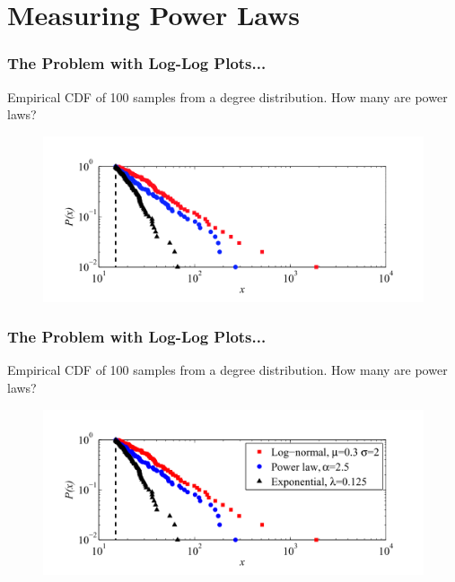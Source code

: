 \documentclass{beamer}
\begin{document}
\section{Measuring Power Laws}
		
		\begin{frame}\frametitle{The Problem with Log-Log Plots...}
		Empirical CDF of 100 samples from a degree distribution. How many are power laws?
		\begin{figure}
			\centering
				\includegraphics[width=\textwidth]{4_1_censored}
			\caption{\tiny{}} 
		\end{figure}
		  	
		\end{frame}

		
		\begin{frame}\frametitle{The Problem with Log-Log Plots...}
		Empirical CDF of 100 samples from a degree distribution. How many are power laws?
		  	\begin{figure}
			\centering
				\includegraphics[width=\textwidth]{4_1}
			\caption{\tiny{}} 
		\end{figure}
		\end{frame}
\end{document}
